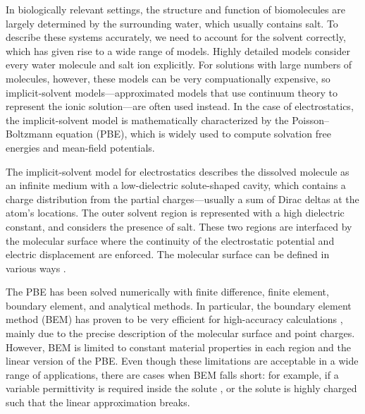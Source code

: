 In biologically relevant settings, the structure and function of biomolecules are largely determined by the surrounding water, which usually contains salt. 
To describe these systems accurately, we need to account for the solvent correctly, which has given rise to a wide range of models.\cite{onufriev2018water}
Highly detailed models consider every water molecule and salt ion explicitly.
For solutions with large numbers of molecules, however, these models can be very compuationally expensive, so implicit-solvent models---approximated models that use continuum theory to represent the ionic solution---are often used instead.\cite{RouxSimonson1999,DecherchiETal2015}
In the case of electrostatics, the implicit-solvent model is mathematically characterized by the Poisson--Boltzmann equation (PBE)\cite{Baker2004,Bardhan2012}, which is widely used to compute solvation free energies and mean-field potentials.

The implicit-solvent model for electrostatics describes the dissolved molecule as an infinite medium with a low-dielectric solute-shaped cavity, which contains a charge distribution from the partial charges---usually a sum of Dirac deltas at the atom's locations.
The outer solvent region is represented with a high dielectric constant, and considers the presence of salt.
These two regions are interfaced by the molecular surface where the continuity of the electrostatic potential and electric displacement are enforced.
The molecular surface can be defined in various ways \cite{HarrisBoschitcshFenley2013}.


The PBE has been solved numerically with finite difference\cite{BakerETal2001,GilsonETal1985,JurrusETal2018,LiETal2019}, finite element\cite{HolstETal2012,BondEtal2010}, boundary element\cite{boschitsch2002fast,LuETal2006,AltmanBardhanWhiteTidor09,bajaj2011efficient,GengKrasny2013,CooperBardhanBarba2014}, and analytical\cite{YapHeadgordon2010,FelbergETal2017} methods.
In particular, the boundary element method (BEM) has proven to be very efficient for high-accuracy calculations \cite{GengKrasny2013,CooperBardhanBarba2014}, mainly due to the precise description of the molecular surface and point charges. 
However, BEM is limited to constant material properties in each region and the linear version of the PBE. 
Even though these limitations are acceptable in a wide range of applications, there are cases when BEM falls short: for example, if a variable permittivity is required inside the solute \cite{grant2001smooth,li2013dielectric}, or the solute is highly charged such that the linear approximation breaks\cite{FogolariETal1999}.

